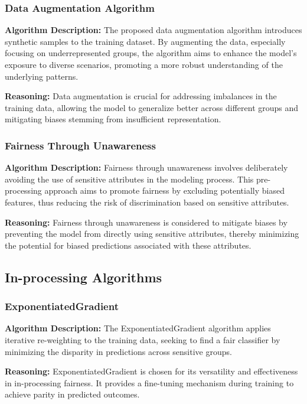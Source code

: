 \subsubsection{Data Augmentation Algorithm}

\textbf{Algorithm Description:} The proposed data augmentation algorithm introduces synthetic samples to the training dataset. By augmenting the data, especially focusing on underrepresented groups, the algorithm aims to enhance the model's exposure to diverse scenarios, promoting a more robust understanding of the underlying patterns.

\textbf{Reasoning:} Data augmentation is crucial for addressing imbalances in the training data, allowing the model to generalize better across different groups and mitigating biases stemming from insufficient representation.

\subsubsection{Fairness Through Unawareness}

\textbf{Algorithm Description:} Fairness through unawareness involves deliberately avoiding the use of sensitive attributes in the modeling process. This pre-processing approach aims to promote fairness by excluding potentially biased features, thus reducing the risk of discrimination based on sensitive attributes.

\textbf{Reasoning:} Fairness through unawareness is considered to mitigate biases by preventing the model from directly using sensitive attributes, thereby minimizing the potential for biased predictions associated with these attributes.

\subsection{In-processing Algorithms}

\subsubsection{ExponentiatedGradient}

\textbf{Algorithm Description:} The ExponentiatedGradient algorithm applies iterative re-weighting to the training data, seeking to find a fair classifier by minimizing the disparity in predictions across sensitive groups.

\textbf{Reasoning:} ExponentiatedGradient is chosen for its versatility and effectiveness in in-processing fairness. It provides a fine-tuning mechanism during training to achieve parity in predicted outcomes.

